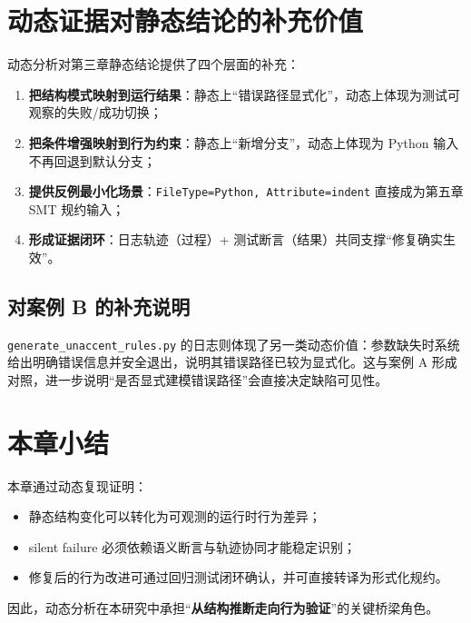 \section{动态证据对静态结论的补充价值}
动态分析对第三章静态结论提供了四个层面的补充：
\begin{enumerate}
    \item \textbf{把结构模式映射到运行结果}：静态上“错误路径显式化”，动态上体现为测试可观察的失败/成功切换；
    \item \textbf{把条件增强映射到行为约束}：静态上“新增分支”，动态上体现为 Python 输入不再回退到默认分支；
    \item \textbf{提供反例最小化场景}：\texttt{FileType=Python, Attribute=indent} 直接成为第五章 SMT 规约输入；
    \item \textbf{形成证据闭环}：日志轨迹（过程）+ 测试断言（结果）共同支撑“修复确实生效”。
\end{enumerate}

\subsection*{对案例 B 的补充说明}
\texttt{generate\_unaccent\_rules.py} 的日志则体现了另一类动态价值：参数缺失时系统给出明确错误信息并安全退出，说明其错误路径已较为显式化。这与案例 A 形成对照，进一步说明“是否显式建模错误路径”会直接决定缺陷可见性。

\section{本章小结}
本章通过动态复现证明：
\begin{itemize}
    \item 静态结构变化可以转化为可观测的运行时行为差异；
    \item silent failure 必须依赖语义断言与轨迹协同才能稳定识别；
    \item 修复后的行为改进可通过回归测试闭环确认，并可直接转译为形式化规约。
\end{itemize}

因此，动态分析在本研究中承担“\textbf{从结构推断走向行为验证}”的关键桥梁角色。